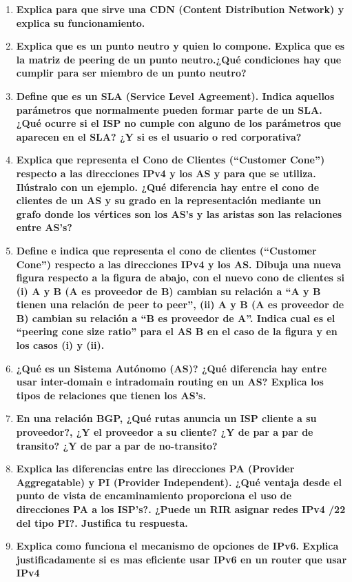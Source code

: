 \documentclass[a4paper,10pt]{article}
\begin{document}
\begin{enumerate}
  \item \textbf{Explica para que sirve una CDN (Content Distribution Network) y explica su
funcionamiento.}

  \item \textbf{Explica que es un punto neutro y quien lo compone. Explica que es la matriz de peering
de un punto neutro.¿Qué condiciones hay que cumplir para ser miembro de un punto neutro?}

  \item \textbf{Define que es un SLA (Service Level Agreement). Indica aquellos parámetros que
normalmente pueden formar parte de un SLA. ¿Qué ocurre si el ISP no cumple con alguno de los
parámetros que aparecen en el SLA? ¿Y si es el usuario o red corporativa?}

  \item \textbf{Explica que representa el Cono de Clientes (“Customer Cone”) respecto a las direcciones
IPv4 y los AS y para que se utiliza. Ilústralo con un ejemplo. ¿Qué diferencia hay entre el cono de
clientes de un AS y su grado en la representación mediante un grafo donde los vértices son los
AS’s y las aristas son las relaciones entre AS’s?}

  \item \textbf{Define e indica que representa el cono de clientes (“Customer Cone”) respecto a las
direcciones IPv4 y los AS. Dibuja una nueva figura respecto a la figura de abajo, con el nuevo
cono de clientes si (i) A y B (A es proveedor de B) cambian su relación a “A y B tienen una relación
de peer to peer”, (ii) A y B (A es proveedor de B) cambian su relación a “B es proveedor de A”.
Indica cual es el ``peering cone size ratio'' para el AS B en el caso de la figura y en los casos (i) y (ii).}

  \item \textbf{¿Qué es un Sistema Autónomo (AS)? ¿Qué diferencia hay entre usar inter-domain e intradomain routing en un AS? Explica los tipos de relaciones que tienen los AS’s.}

  \item \textbf{En una relación BGP, ¿Qué rutas anuncia un ISP cliente a su proveedor?, ¿Y el proveedor a
su cliente? ¿Y de par a par de transito? ¿Y de par a par de no-transito?}

  \item \textbf{Explica las diferencias entre las direcciones PA (Provider Aggregatable) y PI (Provider
Independent). ¿Qué ventaja desde el punto de vista de encaminamiento proporciona
el uso de direcciones PA a los ISP’s?. ¿Puede un RIR asignar redes IPv4 /22 del tipo
PI?. Justifica tu respuesta.}

  \item \textbf{Explica como funciona el mecanismo de opciones de IPv6. Explica justificadamente si
es mas eficiente usar IPv6 en un router que usar IPv4}
\end{enumerate}
\end{document}
